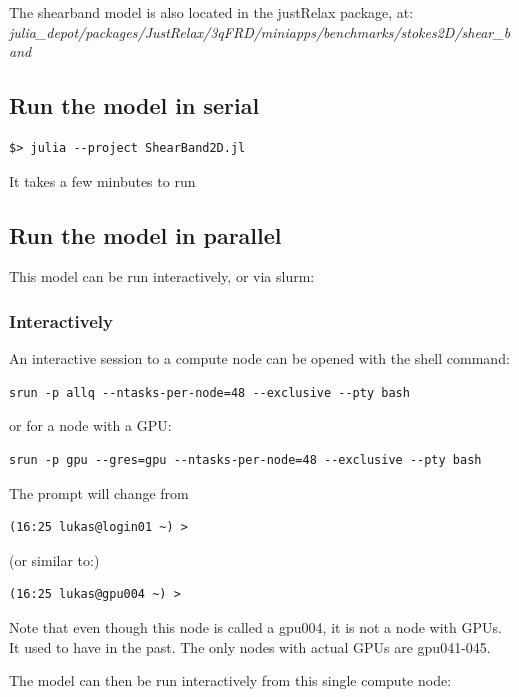 \documentclass{article}
\begin{document}
The shearband model is also located in the justRelax package, at:
\textit{julia\_depot/packages/JustRelax/3qFRD/miniapps/benchmarks/stokes2D/shear\_band}

\subsection{Run the model in serial}

\begin{verbatim}
$> julia --project ShearBand2D.jl
\end{verbatim}

It takes a few minbutes to run

\subsection{Run the model in parallel}

This model can be run interactively, or via slurm:

\subsubsection{Interactively}

An interactive session to a compute node can be opened with the shell command:

\begin{verbatim}
srun -p allq --ntasks-per-node=48 --exclusive --pty bash
\end{verbatim}

or for a node with a GPU:

\begin{verbatim}
srun -p gpu --gres=gpu --ntasks-per-node=48 --exclusive --pty bash
\end{verbatim}

The prompt will change from 

\begin{verbatim}
(16:25 lukas@login01 ~) >
\end{verbatim}

(or similar to:)

\begin{verbatim}
(16:25 lukas@gpu004 ~) > 
\end{verbatim}

Note that even though this node is called a gpu004, it is not a node with GPUs.
It used to have in the past. The only nodes with actual GPUs are gpu041-045.

The model can then be run interactively from this single compute node:
\end{document}
